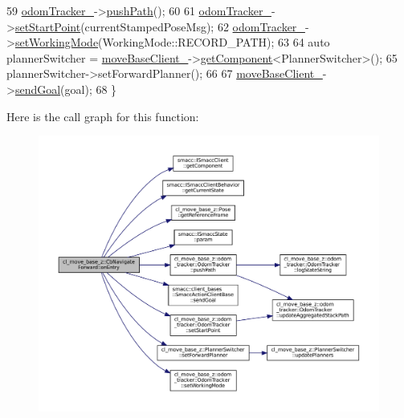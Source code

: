 \begin{DoxyCode}
59     \hyperlink{classcl__move__base__z_1_1CbNavigateForward_a7583a4d669af48618bd45950db8e5292}{odomTracker\_}->\hyperlink{classcl__move__base__z_1_1odom__tracker_1_1OdomTracker_a205ee48ec8b4599658e7408fc4755239}{pushPath}();
60 
61     \hyperlink{classcl__move__base__z_1_1CbNavigateForward_a7583a4d669af48618bd45950db8e5292}{odomTracker\_}->\hyperlink{classcl__move__base__z_1_1odom__tracker_1_1OdomTracker_a9f4989c6353022c2ec3b0546c09bf3bc}{setStartPoint}(currentStampedPoseMsg);
62     \hyperlink{classcl__move__base__z_1_1CbNavigateForward_a7583a4d669af48618bd45950db8e5292}{odomTracker\_}->\hyperlink{classcl__move__base__z_1_1odom__tracker_1_1OdomTracker_aeed01bdefd9a1cc709b0b3e4eed285ed}{setWorkingMode}(WorkingMode::RECORD\_PATH);
63 
64     \textcolor{keyword}{auto} plannerSwitcher = \hyperlink{classcl__move__base__z_1_1CbMoveBaseClientBehaviorBase_ab2ef219464cfac8659b4a87c8d0db6d5}{moveBaseClient\_}->\hyperlink{classsmacc_1_1ISmaccClient_adef78db601749ca63c19e74a27cb88cc}{getComponent}<PlannerSwitcher>();
65     plannerSwitcher->setForwardPlanner();
66 
67     \hyperlink{classcl__move__base__z_1_1CbMoveBaseClientBehaviorBase_ab2ef219464cfac8659b4a87c8d0db6d5}{moveBaseClient\_}->\hyperlink{classsmacc_1_1client__bases_1_1SmaccActionClientBase_a9c47a5094ac8afb01680307fe5eca922}{sendGoal}(goal);
68 \}
\end{DoxyCode}
Here is the call graph for this function\+:
\nopagebreak
\begin{figure}[H]
\begin{center}
\leavevmode
\includegraphics[width=350pt]{classcl__move__base__z_1_1CbNavigateForward_af9a2e49071de287922c3f5963a079b95_cgraph}
\end{center}
\end{figure}
\mbox{\label{classcl__move__base__z_1_1CbNavigateForward_a2160484562ef5fb1c655fab7f990241e}} 
